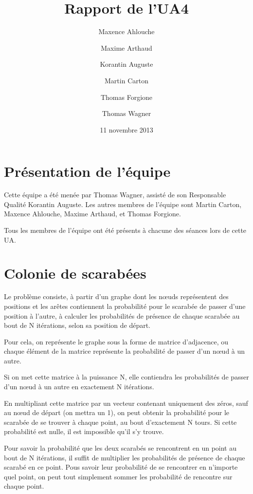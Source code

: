 \documentclass{scrartcl} \usepackage[utf8]{inputenc}
\begin{document}
\title{Rapport de l'UA4} \author{Maxence Ahlouche \and Maxime Arthaud
  \and Korantin Auguste \and Martin Carton \and Thomas Forgione \and
  Thomas Wagner} \date{11 novembre 2013} \maketitle \tableofcontents
\newpage

\section{Présentation de l'équipe}
  Cette équipe a été menée par Thomas Wagner, assisté de son
  Responsable Qualité Korantin Auguste. Les autres membres de l'équipe
  sont Martin Carton, Maxence Ahlouche, Maxime Arthaud, et Thomas
  Forgione.

  Tous les membres de l'équipe ont été présents à chacune des séances
  lors de cette UA.

\section{Colonie de scarabées}

  Le problème consiste, à partir d'un graphe dont les nœuds
  représentent des positions et les arêtes contiennent la probabilité
  pour le scarabée de passer d'une position à l'autre, à calculer les
  probabilités de présence de chaque scarabée au bout de N itérations,
  selon sa position de départ.

  Pour cela, on représente le graphe sous la forme de matrice
  d'adjacence, ou chaque élément de la matrice représente la
  probabilité de passer d'un nœud à un autre.

  Si on met cette matrice à la puissance N, elle contiendra les
  probabilités de passer d'un nœud à un autre en exactement N
  itérations.

  En multipliant cette matrice par un vecteur contenant uniquement des
  zéros, sauf au nœud de départ (on mettra un 1), on peut obtenir la
  probabilité pour le scarabée de se trouver à chaque point, au bout
  d'exactement N tours.  Si cette probabilité est nulle, il est
  impossible qu'il s'y trouve.

  Pour savoir la probabilité que les deux scarabés se rencontrent en
  un point au bout de N itérations, il suffit de multiplier les
  probabilités de présence de chaque scarabé en ce point.  Pous savoir
  leur probabilité de se rencontrer en n'importe quel point, on peut
  tout simplement sommer les probabilité de rencontre sur chaque
  point.
\end{document}
